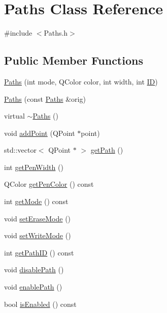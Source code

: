 \hypertarget{classPaths}{
\section{Paths Class Reference}
\label{classPaths}
}


{\ttfamily \#include $<$Paths.h$>$}\subsection*{Public Member Functions}
\begin{DoxyCompactItemize}
\item 
\hyperlink{classPaths_a66d8dd2a1590fe53cc7b6fb5d794714c}{Paths} (int mode, QColor color, int width, int \hyperlink{classPaths_a54282ab5ada2fefcd9344d28e73db4c1}{ID})
\item 
\hyperlink{classPaths_a242273749e17d4d01bdf6361cacfd681}{Paths} (const \hyperlink{classPaths}{Paths} \&orig)
\item 
virtual \hyperlink{classPaths_acfa042f197a222bd6c7bc0b08d94d867}{$\sim$Paths} ()
\item 
void \hyperlink{classPaths_a202e6285ef5bf350b32e3cf0c8ec0da0}{addPoint} (QPoint $\ast$point)
\item 
std::vector$<$ QPoint $\ast$ $>$ \hyperlink{classPaths_a4ac5bea87220875022abb6cdbb3b00f4}{getPath} ()
\item 
int \hyperlink{classPaths_a3cd98da812b83627277d7ecdd236e0d8}{getPenWidth} ()
\item 
QColor \hyperlink{classPaths_a585370c009c5039487023dd034da4649}{getPenColor} () const 
\item 
int \hyperlink{classPaths_a42cd16bc8b70319cf6d4477c518c6bf3}{getMode} () const 
\item 
void \hyperlink{classPaths_a3087ce9e69e51f9a2dc2add3b6278761}{setEraseMode} ()
\item 
void \hyperlink{classPaths_a67b012579208e4bf513db86580d8c439}{setWriteMode} ()
\item 
int \hyperlink{classPaths_a5203e25740ac9ed49429df9937e09be0}{getPathID} () const 
\item 
void \hyperlink{classPaths_af5bde53198945338dad9eadf3fcc9d88}{disablePath} ()
\item 
void \hyperlink{classPaths_a2d96d9d2e548e20f99b02e515e1ae0a9}{enablePath} ()
\item 
bool \hyperlink{classPaths_a5791dac09ef3d2b369d821a2e18c59e4}{isEnabled} () const 
\end{DoxyCompactItemize}
